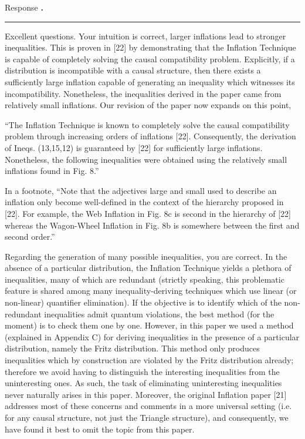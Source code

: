 \documentclass[]{article}
\newcounter{refereecounter}
\newcounter{commentcounter}[refereecounter]
\newcommand{\getresponselabel}{Response \textbf{\arabic{refereecounter}.\arabic{commentcounter}}}
\newcommand{\response}[1]{
    \vspace{1em}
    \getresponselabel \\
    \textcolor{darkgray}{\rule{\linewidth}{0.5pt}}
    #1
}
\begin{document}
    \response{
        Excellent questions. Your intuition is correct, larger inflations lead to stronger inequalities. This is proven in [22] by demonstrating that the Inflation Technique is capable of completely solving the causal compatibility problem. Explicitly, if a distribution is incompatible with a causal structure, then there exists a sufficiently large inflation capable of generating an inequality which witnesses its incompatibility. Nonetheless, the inequalities derived in the paper came from relatively small inflations. Our revision of the paper now expands on this point,

        ``The Inflation Technique is known to completely solve the causal compatibility problem through increasing orders of inflations [22]. Consequently, the derivation of Ineqs. (13,15,12) is guaranteed by [22] for sufficiently large inflations. Nonetheless, the following inequalities were obtained using the relatively small inflations found in Fig. 8.''

        In a footnote,
        ``Note that the adjectives large and small used to describe an inflation only become well-defined in the context of the hierarchy proposed in [22]. For example, the Web Inflation in Fig. 8c is second in the hierarchy of [22] whereas the Wagon-Wheel Inflation in Fig. 8b is somewhere between the first and second order.''

        Regarding the generation of many possible inequalities, you are correct. In the absence of a particular distribution, the Inflation Technique yields a plethora of inequalities, many of which are redundant (strictly speaking, this problematic feature is shared among many inequality-deriving techniques which use linear (or non-linear) quantifier elimination). If the objective is to identify which of the non-redundant inequalities admit quantum violations, the best method (for the moment) is to check them one by one. However, in this paper we used a method (explained in Appendix C) for deriving inequalities in the presence of a particular distribution, namely the Fritz distribution. This method only produces inequalities which by construction are violated by the Fritz distribution already; therefore we avoid having to distinguish the interesting inequalities from the uninteresting ones. As such, the task of eliminating uninteresting inequalities never naturally arises in this paper. Moreover, the original Inflation paper [21] addresses most of these concerns and comments in a more universal setting (i.e. for any causal structure, not just the Triangle structure), and consequently, we have found it best to omit the topic from this paper.
    }
\end{document}
